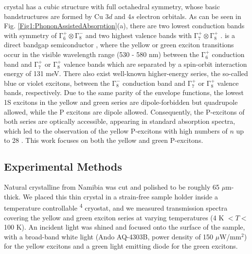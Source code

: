 \documentclass[aps,reprint,amsmath,amssymb,prb]{revtex4-1}
\begin{document}
 crystal has a cubic structure with full octahedral symmetry, whose basic bandstructures are formed by Cu 3$d$ and 4$s$ electron orbitals. As can be seen in Fig. \ref{Fig1:PhononAssistedAbsorption}(a), there are two lowest conduction bands with symmetry of $\mathrm{\Gamma_{6}^{+}}\otimes \mathrm{\Gamma_{8}^{-}}$ and two highest valence bands with $\mathrm{\Gamma_{7}^{+}}\otimes \mathrm{\Gamma_{8}^{+}}$ \cite{Schone2017}.  is a direct bandgap semiconductor \cite{Kavoulakis1997}, where the yellow or green exciton transitions occur in the visible wavelength range (530 - 580 nm) between the $\mathrm{\Gamma_{6}^{+}}$
conduction band and  $\mathrm{\Gamma_{7}^{+}}$ or $\mathrm{\Gamma_{8}^{+}}$ valence bands which are separated by a spin-orbit interaction energy of 131 meV. There also exist well-known higher-energy series, the so-called blue or violet excitons, between the $\mathrm{\Gamma_{8}^{-}}$ conduction band and  $\mathrm{\Gamma_{7}^{+}}$ or $\mathrm{\Gamma_{8}^{+}}$ valence bands, respectively. Due to the same parity of the envelope functions, the lowest 1S excitons in the yellow and green series are dipole-forbidden but quadrupole allowed, while the P excitons are dipole allowed. Consequently, the P-excitons of both series are optically accessible, appearing in standard absorption spectra, which led to the observation of the yellow P-excitons with high numbers of $n$ up to 28 {\cite{Heckotter2020_2}}. This work focuses on both the yellow and green P-excitons.  

\subsection{Experimental Methods}

Natural crystalline  from Namibia was cut and polished to be roughly 65 $\mu$m-thick. We placed this thin  crystal in a strain-free sample holder inside a temperature controllable \textsuperscript{4} cryostat, and we measured transmission spectra covering the yellow and green exciton series at varying temperatures (4 K $< T <$ 100 K). An incident light was shined and focused onto the surface of the sample, with a broad-band white light (Ando AQ-4303B, power density of 150 $\mu$W/mm$^2$) for the yellow excitons and a green light emitting diode for the green excitons. 
\end{document}
